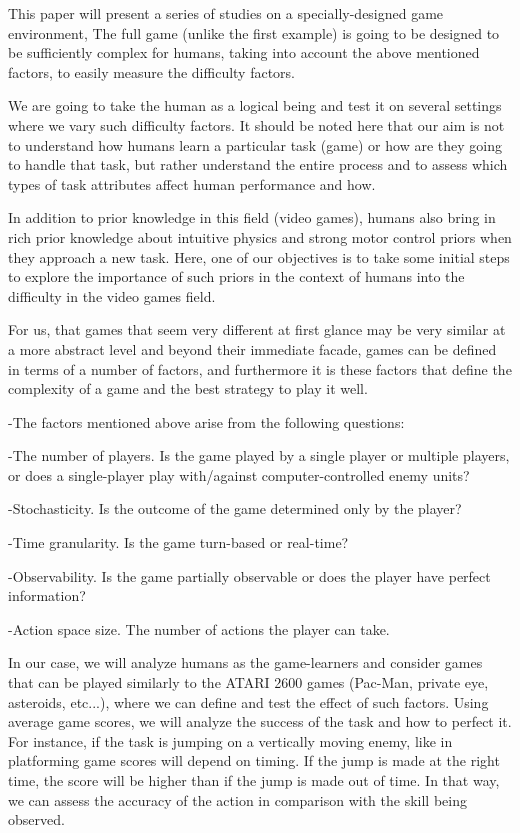 This paper will present a series of studies on a specially-designed game environment, The full game (unlike the first example) is going to be designed to be sufficiently complex for humans, taking into account the above mentioned factors, to easily measure the difficulty factors.

We are going to take the human as a logical being and test it on several settings where we vary such difficulty factors. It should be noted here that our aim is not to understand how humans learn a particular task (game) or how are they going to handle that task, but rather understand the entire process and to assess which types of task attributes affect human performance and how.

In addition to prior knowledge in this field (video games), humans also bring in rich prior knowledge about intuitive physics and strong motor control priors when they approach a new task. Here, one of our objectives is to take some initial steps to explore the importance of such priors in the context of humans into the difficulty in the video games field.

For us, that games that seem very different at first glance may be very similar at a more abstract level and beyond their immediate facade, games can be defined in terms of a number of factors, and furthermore it is these factors that define the complexity of a game and the best strategy to play it well.

-The factors mentioned above arise from the following questions:

-The number of players. Is the game played by a single player or multiple players, or does a single-player play with/against computer-controlled enemy units?

-Stochasticity. Is the outcome of the game determined only by the player?

-Time granularity. Is the game turn-based or real-time?

-Observability. Is the game partially observable or does the player have perfect information?

-Action space size. The number of actions the player can take.


In our case, we will analyze humans as the game-learners and consider games that can be played similarly to the ATARI 2600 games (Pac-Man, private eye, asteroids, etc...), where we can define and test the effect of such factors. Using average game scores, we will analyze the success of the task and how to perfect it. 
For instance, if the task is jumping on a vertically moving enemy, like in platforming game scores will depend on timing. If the jump is made at the right time, the score will be higher than if the jump is made out of time. In that way, we can assess the accuracy of the action in comparison with the skill being observed.

